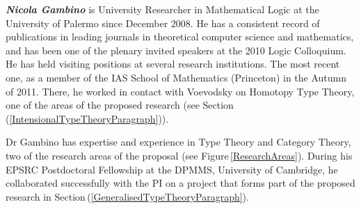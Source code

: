 \documentclass[11pt,twocolumn]{article}
\newcommand{\pref}[1]{\,(\ref{#1})}
\begin{document}
\smallskip\noindent
\textbf{\em Nicola Gambino}
%
%
is University Researcher in Mathematical Logic at the University of Palermo
since December 2008.  He has a consistent record of publications in leading
journals in theoretical computer science and mathematics, and 
has been one of the plenary invited speakers at the 2010 Logic Colloquium.  
He has held visiting positions at several research institutions. 
The most recent one, as %
a member of the IAS School of Mathematics (Princeton) in the Autumn of 2011.
There, he worked in contact with Voevodsky %
on Homotopy Type Theory, one of the areas of the proposed research (see
Section\pref{IntensionalTypeTheoryParagraph}). 

Dr Gambino has expertise and experience in Type Theory and Category Theory,
two of the research areas of the proposal (see Figure\,\ref{ResearchAreas}). 
During his EPSRC Postdoctoral Fellowship at the DPMMS, University of
Cambridge, he collaborated successfully with the PI on a project that forms
part of the proposed research in Section\pref{GeneralisedTypeTheoryParagraph}.
\end{document}

